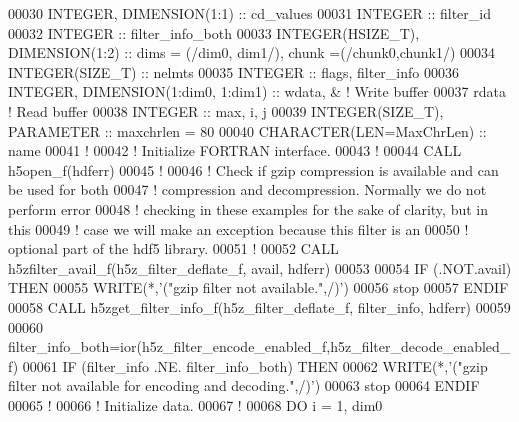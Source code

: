\begin{DoxyCode}
00030   \textcolor{keywordtype}{INTEGER}, \textcolor{keywordtype}{DIMENSION(1:1)} :: cd\_values
00031   \textcolor{keywordtype}{INTEGER} :: filter\_id
00032   \textcolor{keywordtype}{INTEGER} :: filter\_info\_both
00033   \textcolor{keywordtype}{INTEGER(HSIZE\_T)}, \textcolor{keywordtype}{DIMENSION(1:2)} :: dims = (/dim0, dim1/), chunk =(/chunk0,chunk1/)
00034   \textcolor{keywordtype}{INTEGER(SIZE\_T)} :: nelmts
00035   \textcolor{keywordtype}{INTEGER} :: flags, filter\_info
00036   \textcolor{keywordtype}{INTEGER}, \textcolor{keywordtype}{DIMENSION(1:dim0, 1:dim1)} :: wdata, & \textcolor{comment}{! Write buffer }
00037                                         rdata    \textcolor{comment}{! Read buffer}
00038   \textcolor{keywordtype}{INTEGER} :: max, i, j
00039   \textcolor{keywordtype}{INTEGER(SIZE\_T)}, \textcolor{keywordtype}{PARAMETER} :: maxchrlen = 80
00040   \textcolor{keywordtype}{CHARACTER(LEN=MaxChrLen)} :: name
00041   \textcolor{comment}{!}
00042   \textcolor{comment}{! Initialize FORTRAN interface.}
00043   \textcolor{comment}{!}
00044   \textcolor{keyword}{CALL }h5open\_f(hdferr)
00045   \textcolor{comment}{! }
00046   \textcolor{comment}{!  Check if gzip compression is available and can be used for both}
00047   \textcolor{comment}{!  compression and decompression.  Normally we do not perform error}
00048   \textcolor{comment}{!  checking in these examples for the sake of clarity, but in this}
00049   \textcolor{comment}{!  case we will make an exception because this filter is an}
00050   \textcolor{comment}{!  optional part of the hdf5 library.}
00051   \textcolor{comment}{!  }
00052   \textcolor{keyword}{CALL }h5zfilter\_avail\_f(h5z\_filter\_deflate\_f, avail, hdferr)
00053 
00054   \textcolor{keywordflow}{IF} (.NOT.avail) \textcolor{keywordflow}{THEN}
00055      \textcolor{keyword}{WRITE}(*,\textcolor{stringliteral}{'("gzip filter not available.",/)'})
00056      stop
00057 \textcolor{keywordflow}{  ENDIF}
00058   \textcolor{keyword}{CALL }h5zget\_filter\_info\_f(h5z\_filter\_deflate\_f, filter\_info, hdferr)
00059 
00060   filter\_info\_both=ior(h5z\_filter\_encode\_enabled\_f,h5z\_filter\_decode\_enabled\_f)
00061   \textcolor{keywordflow}{IF} (filter\_info .NE. filter\_info\_both) \textcolor{keywordflow}{THEN}
00062      \textcolor{keyword}{WRITE}(*,\textcolor{stringliteral}{'("gzip filter not available for encoding and decoding.",/)'})
00063      stop
00064 \textcolor{keywordflow}{  ENDIF}
00065   \textcolor{comment}{!}
00066   \textcolor{comment}{! Initialize data.}
00067   \textcolor{comment}{!}
00068   \textcolor{keywordflow}{DO} i = 1, dim0

\end{DoxyCode}
